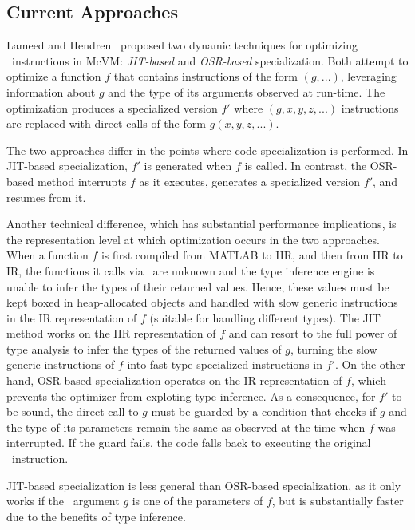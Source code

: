 
\subsection{Current Approaches}
\label{ss:prev-eval-sol}

Lameed and Hendren~\cite{lameed2013feval} proposed two dynamic techniques for optimizing \feval\ instructions in McVM: {\em JIT-based} and {\em OSR-based} specialization. Both attempt to optimize a function $f$ that contains instructions of the form \feval$(g,...)$, leveraging information about $g$ and the type of its arguments observed at run-time. The optimization produces a specialized version $f'$ where \feval$(g,x,y,z,...)$ instructions are replaced with direct calls of the form $g(x,y,z,...)$. 

The two approaches differ in the points where code specialization is performed. In JIT-based specialization, $f'$ is generated when $f$ is called. In contrast, the OSR-based method interrupts $f$ as it executes, generates a specialized version $f'$, and resumes from it.  

Another technical difference, which has substantial performance implications, is the representation level at which optimization occurs in the two approaches. When a function $f$ is first compiled from MATLAB to IIR, and then from IIR to IR, the functions it calls via \feval\ are unknown and the type inference engine is unable to infer the types of their returned values. Hence, these values must be kept boxed in heap-allocated objects and handled with slow generic instructions in the IR representation of $f$ (suitable for handling different types). The JIT method works on the IIR representation of $f$ and can resort to the full power of type analysis to infer the types of the returned values of $g$, turning the slow generic instructions of $f$ into fast type-specialized instructions in $f'$. On the other hand, OSR-based specialization operates on the IR representation of $f$, which prevents the optimizer from exploting type inference. As a consequence, for $f'$ to be sound, the direct call to $g$ must be guarded by a condition that checks if $g$ and the type of its parameters remain the same as observed at the time when $f$ was interrupted. If the guard fails, the code falls back to executing the original \feval\ instruction. 

JIT-based specialization is less general than OSR-based specialization, as it only works if the \feval\ argument $g$ is one of the parameters of $f$, but is substantially faster due to the benefits of type inference.

